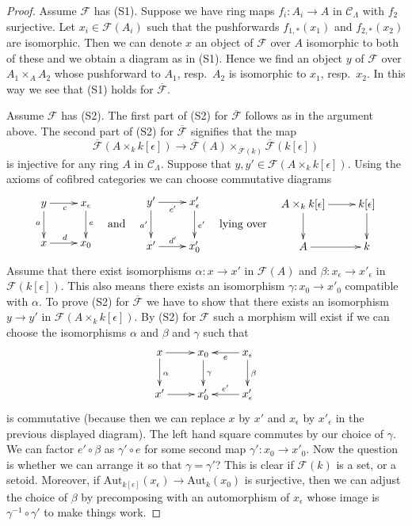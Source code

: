 \begin{proof}
Assume $\mathcal{F}$ has (S1).
Suppose we have ring maps $f_i : A_i \to A$ in $\mathcal{C}_\Lambda$
with $f_2$ surjective. Let $x_i \in \mathcal{F}(A_i)$ such that
the pushforwards $f_{1, *}(x_1)$ and $f_{2, *}(x_2)$ are isomorphic.
Then we can denote $x$ an object of $\mathcal{F}$ over $A$ isomorphic
to both of these and we obtain a diagram as in (S1). Hence we find
an object $y$ of $\mathcal{F}$ over $A_1 \times_A A_2$ whose pushforward
to $A_1$, resp.\ $A_2$ is isomorphic to $x_1$, resp.\ $x_2$. In this way
we see that (S1) holds for $\overline{\mathcal{F}}$.

\medskip\noindent
Assume $\mathcal{F}$ has (S2).
The first part of (S2) for $\overline{\mathcal{F}}$ follows as in
the argument above. The second part of (S2) for
$\overline{\mathcal{F}}$ signifies that the map
$$
\overline{\mathcal{F}}(A \times_k k[\epsilon]) \to
\overline{\mathcal{F}}(A)
\times_{\overline{\mathcal{F}}(k)} \overline{\mathcal{F}}(k[\epsilon])
$$
is injective for any ring $A$ in $\mathcal{C}_\Lambda$. Suppose that
$y, y' \in \mathcal{F}(A \times_k k[\epsilon])$. Using the axioms
of cofibred categories we can choose commutative diagrams
$$
\vcenter{
\xymatrix{
y \ar[r]_c \ar[d]_a & x_\epsilon \ar[d]^e \\
x \ar[r]^d          & x_0
}
}
\quad\text{and}\quad
\vcenter{
\xymatrix{
y' \ar[r]_{c'} \ar[d]_{a'} & x'_\epsilon \ar[d]^{e'} \\
x' \ar[r]^{d'}                 & x'_0
}
}
\quad\text{lying over}\quad
\vcenter{
\xymatrix{
A \times_k k[\epsilon] \ar[d] \ar[r] & k[\epsilon] \ar[d] \\
A \ar[r] & k
}
}
$$
Assume that there exist isomorphisms
$\alpha : x \to x'$ in $\mathcal{F}(A)$ and
$\beta : x_\epsilon \to x'_\epsilon$ in $\mathcal{F}(k[\epsilon])$.
This also means there exists an isomorphism $\gamma : x_0 \to x'_0$
compatible with $\alpha$. To prove (S2) for $\overline{\mathcal{F}}$
we have to show that there exists an isomorphism $y \to y'$ in
$\mathcal{F}(A \times_k k[\epsilon])$.
By (S2) for $\mathcal{F}$ such a morphism will exist if we can
choose the isomorphisms $\alpha$ and $\beta$ and $\gamma$ such that
$$
\xymatrix{
x \ar[d]^\alpha \ar[r] & x_0 \ar[d]^\gamma &
x_\epsilon \ar[d]^\beta \ar[l]^e \\
x' \ar[r] & x'_0 & x'_\epsilon \ar[l]_{e'}
}
$$
is commutative (because then we can replace $x$ by $x'$ and $x_\epsilon$
by $x'_\epsilon$ in the previous displayed diagram). The left hand square
commutes by our choice of $\gamma$. We can factor $e' \circ \beta$ as
$\gamma' \circ e$ for some second map
$\gamma' : x_0 \to x'_0$. Now the question is whether we can arrange it so
that $\gamma = \gamma'$? This is clear if $\mathcal{F}(k)$ is a set, or a
setoid. Moreover, if
$\text{Aut}_{k[\epsilon]}(x_\epsilon) \to \text{Aut}_k(x_0)$
is surjective, then we can adjust the choice of $\beta$ by precomposing
with an automorphism of $x_\epsilon$ whose image is
$\gamma^{-1} \circ \gamma'$ to make things work.
\end{proof}

